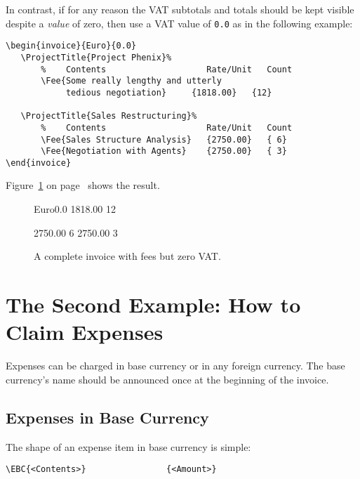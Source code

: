 \documentclass[11pt]{ltxdoc}
\begin{document}
In contrast, if for any reason the VAT subtotals and totals should
be kept visible despite a \textit{value} of zero, then use a VAT
value of \verb-0.0- as in the following example:
\begin{verbatim}
\begin{invoice}{Euro}{0.0}
   \ProjectTitle{Project Phenix}%
       %    Contents                    Rate/Unit   Count
       \Fee{Some really lengthy and utterly
       		tedious negotiation}     {1818.00}   {12}

   \ProjectTitle{Sales Restructuring}%
       %    Contents                    Rate/Unit   Count
       \Fee{Sales Structure Analysis}   {2750.00}   { 6}
       \Fee{Negotiation with Agents}    {2750.00}   { 3}
\end{invoice}
\end{verbatim}


Figure~\ref{invoice_with_zero_VAT} on
page~\pageref{invoice_with_zero_VAT}
shows the result.

\begin{figure}[h]
\begin{invoice}{Euro}{0.0}
		{1818.00}	{12}

           {2750.00}   { 6}
            {2750.00}   { 3}
\end{invoice}
\caption{A complete invoice
		with fees but zero VAT.\label{invoice_with_zero_VAT}}
\end{figure}


\section{The Second Example: How to Claim Expenses}

Expenses can be charged in base currency or in any foreign currency.
The base currency's name should be announced once at the beginning
of the invoice.

\subsection{Expenses in Base Currency}

The shape of an expense item in base currency is simple:

\begin{verbatim}
\EBC{<Contents>}                {<Amount>}
\end{verbatim}
\end{document}
